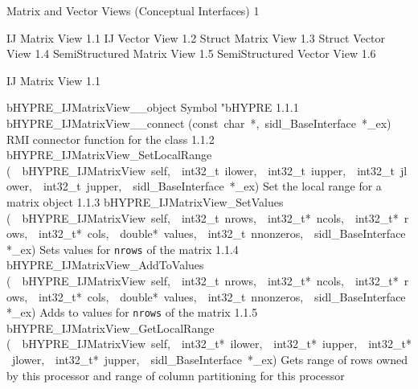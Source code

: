 \documentclass{article}
\begin{document}
\begin{cxxentry}
{}
        {Matrix and Vector Views (Conceptual Interfaces)}
        {}
        {
}
        {1}
\begin{cxxnames}
\cxxitem{}
        {IJ Matrix View}
        {}
        {
}
        {1.1}
\cxxitem{}
        {IJ Vector View}
        {}
        {
}
        {1.2}
\cxxitem{}
        {Struct Matrix View}
        {}
        {
}
        {1.3}
\cxxitem{}
        {Struct Vector View}
        {}
        {
}
        {1.4}
\cxxitem{}
        {SemiStructured Matrix View}
        {}
        {
}
        {1.5}
\cxxitem{}
        {SemiStructured Vector View}
        {}
        {
}
        {1.6}
\end{cxxnames}
\begin{cxxentry}
{}
        {IJ Matrix View}
        {}
        {
}
        {1.1}
\begin{cxxnames}
        {bHYPRE\_IJMatrixView\_\_object}
        {}
        {
Symbol "bHYPRE}
        {1.1.1}
        {bHYPRE\_IJMatrixView\_\_connect}
        {(const\ char\ *,\ sidl\_BaseInterface\ *\_ex)}
        {
RMI connector function for the class}
        {1.1.2}
        {bHYPRE\_IJMatrixView\_SetLocalRange}
        {(\ \ bHYPRE\_IJMatrixView\ self,\ \ int32\_t\ ilower,\ \ int32\_t\ iupper,\ \ int32\_t\ jlower,\ \ int32\_t\ jupper,\ \ sidl\_BaseInterface\ *\_ex)}
        {
Set the local range for a matrix object}
        {1.1.3}
        {bHYPRE\_IJMatrixView\_SetValues}
        {(\ \ bHYPRE\_IJMatrixView\ self,\ \ int32\_t\ nrows,\ \ int32\_t*\ ncols,\ \ int32\_t*\ rows,\ \ int32\_t*\ cols,\ \ double*\ values,\ \ int32\_t\ nnonzeros,\ \ sidl\_BaseInterface\ *\_ex)}
        {
Sets values for {\tt nrows} of the matrix}
        {1.1.4}
        {bHYPRE\_IJMatrixView\_AddToValues}
        {(\ \ bHYPRE\_IJMatrixView\ self,\ \ int32\_t\ nrows,\ \ int32\_t*\ ncols,\ \ int32\_t*\ rows,\ \ int32\_t*\ cols,\ \ double*\ values,\ \ int32\_t\ nnonzeros,\ \ sidl\_BaseInterface\ *\_ex)}
        {
Adds to values for {\tt nrows} of the matrix}
        {1.1.5}
        {bHYPRE\_IJMatrixView\_GetLocalRange}
        {(\ \ bHYPRE\_IJMatrixView\ self,\ \ int32\_t*\ ilower,\ \ int32\_t*\ iupper,\ \ int32\_t*\ jlower,\ \ int32\_t*\ jupper,\ \ sidl\_BaseInterface\ *\_ex)}
        {
Gets range of rows owned by this processor and range of
column partitioning for this processor}
        {}
\label{cxx.1.1.11}

\end{cxxnames}
\end{cxxentry}
\end{cxxentry}
\end{document}
